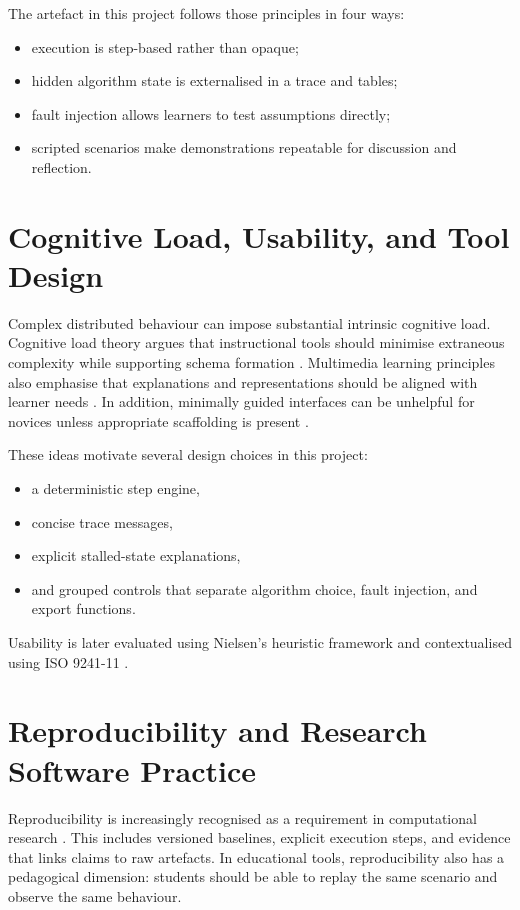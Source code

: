 The artefact in this project follows those principles in four ways:
\begin{itemize}
  \item execution is step-based rather than opaque;
  \item hidden algorithm state is externalised in a trace and tables;
  \item fault injection allows learners to test assumptions directly;
  \item scripted scenarios make demonstrations repeatable for discussion and reflection.
\end{itemize}

\section{Cognitive Load, Usability, and Tool Design}
Complex distributed behaviour can impose substantial intrinsic cognitive load. Cognitive load theory argues that instructional tools should minimise extraneous complexity while supporting schema formation \cite{sweller1988cogload}. Multimedia learning principles also emphasise that explanations and representations should be aligned with learner needs \cite{mayer2009multimedia}. In addition, minimally guided interfaces can be unhelpful for novices unless appropriate scaffolding is present \cite{kirschner2006minimal}.

These ideas motivate several design choices in this project:
\begin{itemize}
  \item a deterministic step engine,
  \item concise trace messages,
  \item explicit stalled-state explanations,
  \item and grouped controls that separate algorithm choice, fault injection, and export functions.
\end{itemize}

Usability is later evaluated using Nielsen's heuristic framework \cite{nielsen1994usability} and contextualised using ISO 9241-11 \cite{iso9241_11_2018}.

\section{Reproducibility and Research Software Practice}
Reproducibility is increasingly recognised as a requirement in computational research \cite{sandve2013ten,wilson2014best,wilkinson2016fair}. This includes versioned baselines, explicit execution steps, and evidence that links claims to raw artefacts. In educational tools, reproducibility also has a pedagogical dimension: students should be able to replay the same scenario and observe the same behaviour.

